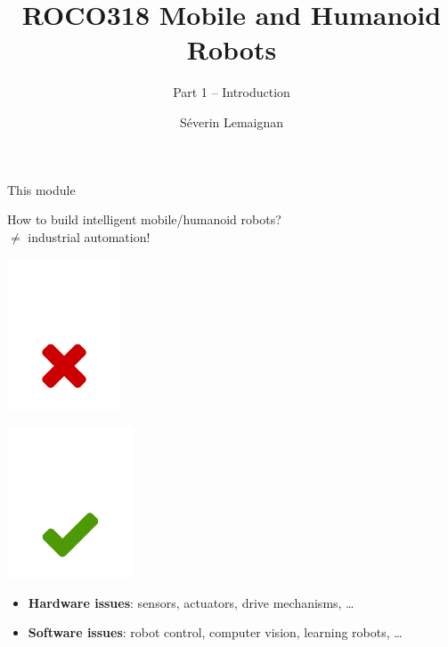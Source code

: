 \documentclass[compress]{beamer}
\title{ROCO318 \newline Mobile and Humanoid Robots}
\subtitle{Part 1 -- Introduction}
\date{}
\author{Séverin Lemaignan}
\institute{Centre for Neural Systems and Robotics\\{\bf Plymouth University}}
\begin{document}

\maketitle


\begin{frame}{This module}

    How to build intelligent mobile/humanoid robots?\\
    $\neq$ industrial automation!

    \begin{multicols}{2}

        \begin{center}
            \includegraphics[height=4.5cm]{no-industrial}

            \includegraphics[height=4.5cm]{yes-humanoid}
        \end{center}

    \end{multicols}

    \pause

    \begin{itemize}
        \item \textbf{Hardware issues}: sensors, actuators, drive mechanisms, \ldots{}
        \item \textbf{Software issues}: robot control, computer vision, learning robots, \ldots{}
    \end{itemize}

\end{frame}
\end{document}
